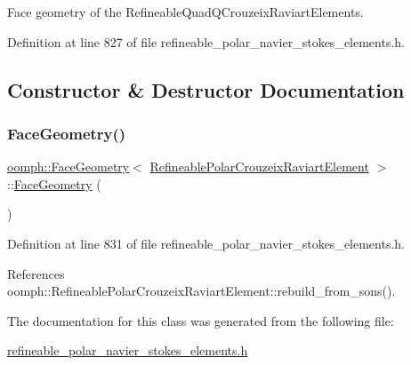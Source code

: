 Face geometry of the Refineable\+Quad\+Q\+Crouzeix\+Raviart\+Elements. 

Definition at line 827 of file refineable\+\_\+polar\+\_\+navier\+\_\+stokes\+\_\+elements.\+h.



\subsection{Constructor \& Destructor Documentation}
\mbox{\label{classoomph_1_1FaceGeometry_3_01RefineablePolarCrouzeixRaviartElement_01_4_ab38e8be9a6f7fd7c16f27a410f7bc9cf}} 
\subsubsection{\texorpdfstring{Face\+Geometry()}{FaceGeometry()}}
{\footnotesize\ttfamily \hyperlink{classoomph_1_1FaceGeometry}{oomph\+::\+Face\+Geometry}$<$ \hyperlink{classoomph_1_1RefineablePolarCrouzeixRaviartElement}{Refineable\+Polar\+Crouzeix\+Raviart\+Element} $>$\+::\hyperlink{classoomph_1_1FaceGeometry}{Face\+Geometry} (\begin{DoxyParamCaption}{ }\end{DoxyParamCaption})\hspace{0.3cm}{\ttfamily [inline]}}



Definition at line 831 of file refineable\+\_\+polar\+\_\+navier\+\_\+stokes\+\_\+elements.\+h.



References oomph\+::\+Refineable\+Polar\+Crouzeix\+Raviart\+Element\+::rebuild\+\_\+from\+\_\+sons().



The documentation for this class was generated from the following file\+:\begin{DoxyCompactItemize}
\item 
\hyperlink{refineable__polar__navier__stokes__elements_8h}{refineable\+\_\+polar\+\_\+navier\+\_\+stokes\+\_\+elements.\+h}\end{DoxyCompactItemize}
